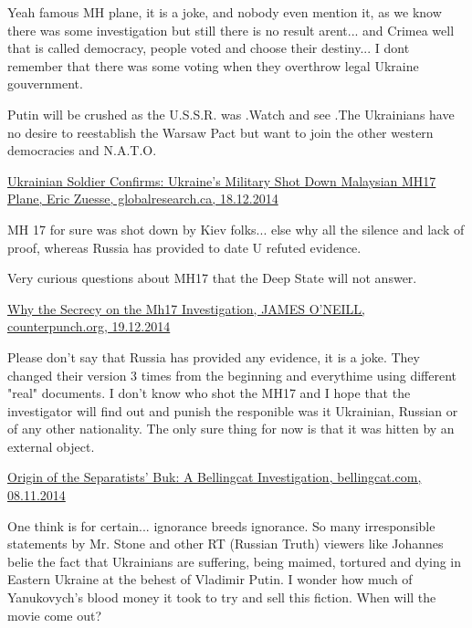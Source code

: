\begin{itemize}
\begin{itemize}

Yeah famous MH plane, it is a joke, and nobody even mention it, as we know
there was some investigation but still there is no result arent... and Crimea
well that is called democracy, people voted and choose their destiny... I dont
remember that there was some voting when they overthrow legal Ukraine
gouvernment.


Putin will be crushed as the U.S.S.R. was .Watch and see .The Ukrainians have
no desire to reestablish the Warsaw Pact but want to join the other western
democracies and N.A.T.O.

\href{https://www.globalresearch.ca/ukrainian-soldier-confirms-ukraines-military-shot-down-malaysian-mh17-plane/5420559}{%
Ukrainian Soldier Confirms: Ukraine’s Military Shot Down Malaysian MH17 Plane, Eric Zuesse, globalresearch.ca, 18.12.2014%
}


MH 17 for sure was shot down by Kiev folks... else why all the silence and lack
of proof, whereas Russia has provided to date U refuted evidence.

Very curious questions about MH17 that the Deep State will not answer.

\href{https://www.counterpunch.org/2014/12/19/why-the-secrecy-on-the-mh17-investigation/}{%
Why the Secrecy on the Mh17 Investigation, JAMES O'NEILL, counterpunch.org, 19.12.2014%
}


Please don't say that Russia has provided any evidence, it is a joke. They
changed their version 3 times from the beginning and everythime using different
"real" documents. I don't know who shot the MH17 and I hope that the
investigator will find out and punish the responible was it Ukrainian, Russian
or of any other nationality. The only sure thing for now is that it was hitten
by an external object.


\href{https://www.bellingcat.com/news/uk-and-europe/2014/11/08/origin-of-the-separatists-buk-a-bellingcat-investigation/}{%
Origin of the Separatists' Buk: A Bellingcat Investigation, bellingcat.com, 08.11.2014%
}


One think is for certain... ignorance breeds ignorance. So many irresponsible
statements by Mr. Stone and other RT (Russian Truth) viewers like Johannes
belie the fact that Ukrainians are suffering, being maimed, tortured and dying
in Eastern Ukraine at the behest of Vladimir Putin. I wonder how much of
Yanukovych's blood money it took to try and sell this fiction. When will the
movie come out?



\end{itemize}
\end{itemize}
